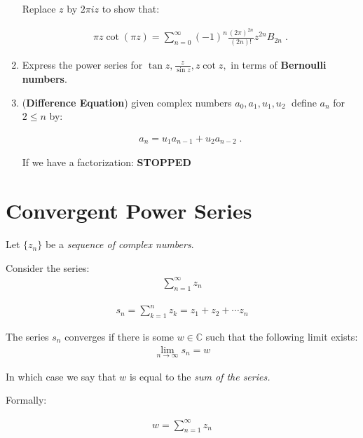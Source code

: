\begin{enumerate}
  Replace $z$ by $2\pi i z$ to show that:

  \begin{align*}
    \pi z \cot(\pi z) = \sum_{n = 0}^\infty (-1)^n \frac{(2\pi)^{2n}}{(2n)!} z^{2n} B_{2n} \;.
  \end{align*}

  \item Express the power series for $\tan z , \frac{z}{\sin z}, z \cot z ,$ in terms of \textbf{Bernoulli numbers}.

  \item (\textbf{Difference Equation}) given complex numbers $a_0, a_1, u_1, u_2 \;$ define $a_n$ for $2 \leq n$ by:

  \begin{align*}
    a_n = u_1 a_{n - 1} +u_2 a_{n - 2} \;.
  \end{align*}

  If we have a factorization: \textbf{STOPPED}
\end{enumerate}

\section{Convergent Power Series}
Let ${ \{ z_n \} }$ be a \emph{sequence of complex numbers}.

Consider the series:
\begin{align*}
  \sum_{n = 1}^{\infty} z_n
\end{align*}

\begin{defn}
  \begin{align*}
    s_n = \sum_{k = 1}^{n} z_k = z_1 + z_2 + \cdots z_n
  \end{align*}
\end{defn}

\begin{defn}
  The series $s_n$ converges if there is some $w \in \mathbb{C}$ such that the following limit exists:
  \begin{align*}
    \lim_{n \to \infty}s_n = w
  \end{align*}
\end{defn}

In which case we say that $w$ is equal to the \emph{sum of the series.}

Formally:

\begin{defn}
  \begin{align*}
    w = \sum_{n = 1}^{\infty} z_n
  \end{align*}
\end{defn}


